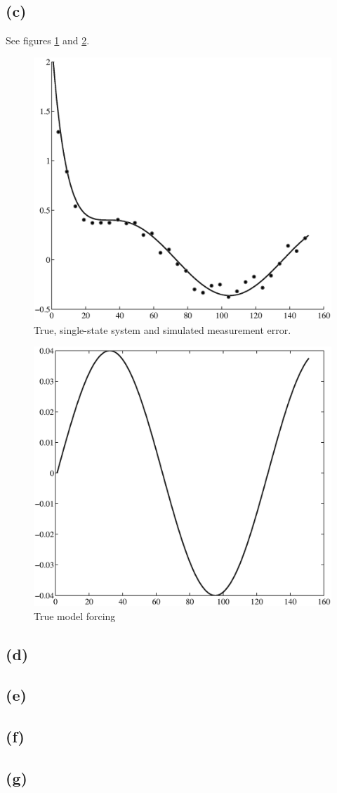 \documentclass[fleqn, letterpaper]{tufte-handout}
\begin{document}
\subsection{(c)}
See figures \ref{2ca} and \ref{2cb}.
\begin{figure}
        \includegraphics[width=\textwidth]{2ca}
        \caption{True, single-state system and simulated measurement error.}
        \label{2ca}
\end{figure}
\begin{figure}
        \includegraphics[width=\textwidth]{2cb}
        \caption{True model forcing}
        \label{2cb}
\end{figure}

\subsection{(d)}
\subsection{(e)}
\subsection{(f)}
\subsection{(g)}
\end{document}
